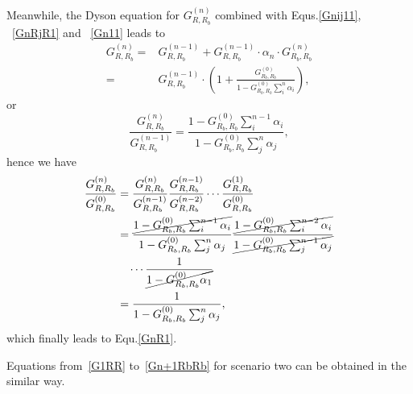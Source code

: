 Meanwhile, the Dyson equation for $G^{(n)}_{R,R_b}$ combined with Equs.\eqref{Gnij11}, ~\eqref{GnRjR1} and ~\eqref{Gn11} leads to
\begin{equation}
\begin{split}
 G^{(n)}_{R,R_b}=& G^{(n-1)}_{R,R_b}+G^{(n-1)}_{R,R_b}\cdot \alpha_n \cdot G^{(n)}_{R_b,R_b}\\
=& G^{(n-1)}_{R,R_b}\cdot (1+ \frac{G^{(0)}_{R_b,R_b}}{1- G^{(0)}_{R_b,R_b}\sum_i^n{\alpha_i}}),
\end{split}
\end{equation}
or
\begin{equation}
 \frac{G^{(n)}_{R,R_b}}{G^{(n-1)}_{R,R_b}}=\frac{1-G^{(0)}_{R_b,R_b}\sum_i^{n-1}{\alpha_i}}{1-G^{(0)}_{R_b,R_b}\sum_j^n{\alpha_j}},
\end{equation}
hence we have
\begin{equation}
\begin{split}
 \frac{G^{(n)}_{R,R_b}}{G^{(0)}_{R,R_b}} &= \frac{G^{(n)}_{R,R_b}}{G^{(n-1)}_{R,R_b}} \frac{G^{(n-1)}_{R,R_b}}{G^{(n-2)}_{R,R_b}}
\cdots \frac{G^{(1)}_{R,R_b}}{G^{(0)}_{R,R_b}}  \\
&= \frac{\cancel{1-G^{(0)}_{R_b,R_b}\sum_i^{n-1}{\alpha_i}}}{1-G^{(0)}_{R_b,R_b}\sum_j^n{\alpha_j}}
\frac{\cancel{1-G^{(0)}_{R_b,R_b}\sum_i^{n-2}{\alpha_i}}}{\cancel{1-G^{(0)}_{R_b,R_b}\sum_j^{n-1}{\alpha_j}}}\\
&\quad \cdots
\frac{1}{\cancel{1-G^{(0)}_{R_b,R_b}{\alpha_1}}} \\
&= \frac{1}{1-G^{(0)}_{R_b,R_b}\sum_j^n{\alpha_j}},
\end{split}
\end{equation}
which finally leads to Equ.\eqref{GnR1}.

Equations from~\ref{G1RR} to~\ref{Gn+1RbRb} for scenario two can be obtained in the similar way. 